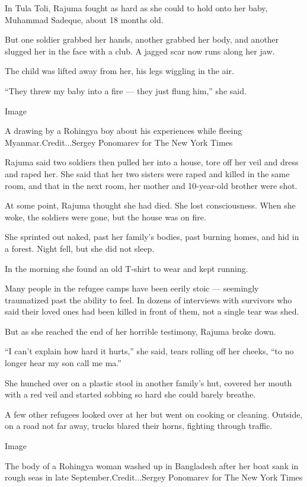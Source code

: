 In Tula Toli, Rajuma fought as hard as she could to hold onto her baby,
Muhammad Sadeque, about 18 months old.

But one soldier grabbed her hands, another grabbed her body, and another
slugged her in the face with a club. A jagged scar now runs along her
jaw.

The child was lifted away from her, his legs wiggling in the air.

``They threw my baby into a fire --- they just flung him,'' she said.

Image

A drawing by a Rohingya boy about his experiences while fleeing
Myanmar.Credit...Sergey Ponomarev for The New York Times

Rajuma said two soldiers then pulled her into a house, tore off her veil
and dress and raped her. She said that her two sisters were raped and
killed in the same room, and that in the next room, her mother and
10-year-old brother were shot.

At some point, Rajuma thought she had died. She lost consciousness. When
she woke, the soldiers were gone, but the house was on fire.

She sprinted out naked, past her family's bodies, past burning homes,
and hid in a forest. Night fell, but she did not sleep.

In the morning she found an old T-shirt to wear and kept running.

Many people in the refugee camps have been eerily stoic --- seemingly
traumatized past the ability to feel. In dozens of interviews with
survivors who said their loved ones had been killed in front of them,
not a single tear was shed.

But as she reached the end of her horrible testimony, Rajuma broke down.

``I can't explain how hard it hurts,'' she said, tears rolling off her
cheeks, ``to no longer hear my son call me ma.''

She hunched over on a plastic stool in another family's hut, covered her
mouth with a red veil and started sobbing so hard she could barely
breathe.

A few other refugees looked over at her but went on cooking or cleaning.
Outside, on a road not far away, trucks blared their horns, fighting
through traffic.

Image

The body of a Rohingya woman washed up in Bangladesh after her boat sank
in rough seas in late September.Credit...Sergey Ponomarev for The New
York Times

